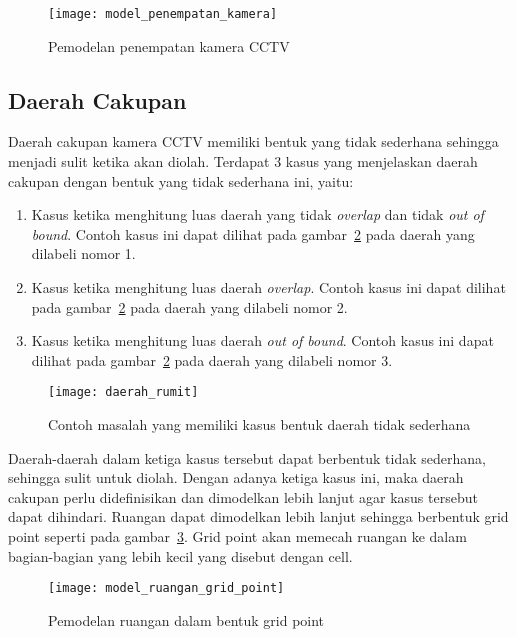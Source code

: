 \begin{figure}[h]
	\centering  
	\texttt{[image: model\_penempatan\_kamera]}
	\caption[Pemodelan penempatan kamera CCTV]{Pemodelan penempatan kamera CCTV} 
	\label{fig:model_penempatan_kamera}
\end{figure}

\subsection{Daerah Cakupan}
Daerah cakupan kamera CCTV memiliki bentuk yang tidak sederhana sehingga menjadi sulit ketika akan diolah. Terdapat 3 kasus yang menjelaskan daerah cakupan dengan bentuk yang tidak sederhana ini, yaitu:
\begin{enumerate}
	\item Kasus ketika menghitung luas daerah yang tidak \textit{overlap} dan tidak \textit{out of bound}. Contoh kasus ini dapat dilihat pada gambar~\ref{fig:daerah_rumit} pada daerah yang dilabeli nomor 1.
	\item Kasus ketika menghitung luas daerah \textit{overlap}. Contoh kasus ini dapat dilihat pada gambar~\ref{fig:daerah_rumit} pada daerah yang dilabeli nomor 2.
	\item Kasus ketika menghitung luas daerah \textit{out of bound}. Contoh kasus ini dapat dilihat pada gambar~\ref{fig:daerah_rumit} pada daerah yang dilabeli nomor 3.
\end{enumerate}

\begin{figure}[h]
	\centering  
	\texttt{[image: daerah\_rumit]}
	\caption[Contoh masalah yang memiliki kasus bentuk daerah tidak sederhana]{Contoh masalah yang memiliki kasus bentuk daerah tidak sederhana} 
	\label{fig:daerah_rumit}
\end{figure}

Daerah-daerah dalam ketiga kasus tersebut dapat berbentuk tidak sederhana, sehingga sulit untuk diolah. Dengan adanya ketiga kasus ini, maka daerah cakupan perlu didefinisikan dan dimodelkan lebih lanjut agar kasus tersebut dapat dihindari. Ruangan dapat dimodelkan lebih lanjut sehingga berbentuk grid point seperti pada gambar~\ref{fig:model_ruangan_grid_point}. Grid point akan memecah ruangan ke dalam bagian-bagian yang lebih kecil yang disebut dengan cell.

\begin{figure}[h]
	\centering  
	\texttt{[image: model\_ruangan\_grid\_point]}
	\caption[Pemodelan ruangan dalam bentuk grid point]{Pemodelan ruangan dalam bentuk grid point} 
	\label{fig:model_ruangan_grid_point}
\end{figure}

